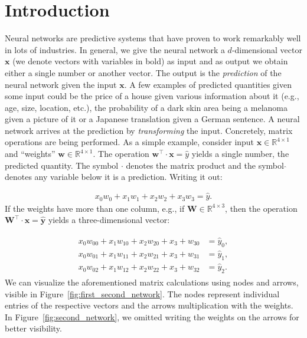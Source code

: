 \section{Introduction}
Neural networks are predictive systems that have proven to work remarkably well in lots of industries. In general, we give the neural network a $d$-dimensional vector $\bm{x}$ (we denote vectors with variables in bold) as input and as output we obtain either a single number or another vector. The output is the \textit{prediction} of the neural network given the input $\bm{x}$. A few examples of predicted quantities given some input could be the price of a house given various information about it (e.g., age, size, location, etc.), the probability of a dark skin area being a melanoma given a picture of it or a Japanese translation given a German sentence. A neural network arrives at the prediction by \textit{transforming} the input. Concretely, matrix operations are being performed. As a simple example, consider input $\bm{x} \in \mathds{R}^{4 \times 1}$ and \enquote{weights} $\bm{w} \in \mathds{R}^{4 \times 1}$. The operation $\bm{w}^\top \cdot \bm{x} = \hat{y}$ yields a single number, the predicted quantity. The symbol $\cdot$ denotes the matrix product and the symbol $\hat{}$ denotes any variable below it is a prediction. Writing it out:

\begin{align} \label{eq:first_network}
    x_0 w_0 + x_1 w_1 + x_2 w_2 + x_3 w _3 = \hat{y}.
\end{align} If the weights have more than one column, e.g., if $\bm{W} \in \mathds{R}^{4 \times 3}$, then the operation $\bm{W}^\top \cdot \bm{x} = \hat{\bm{y}}$ yields a three-dimensional vector:

\begin{align} \label{eq:second_network}
    \begin{split}
        x_0 w_{00} + x_1 w_{10} + x_2 w_{20} + x_3 + w_{30} & = \hat{y}_0, \\
        x_0 w_{01} + x_1 w_{11} + x_2 w_{21} + x_3 + w_{31} & = \hat{y}_1, \\
        x_0 w_{02} + x_1 w_{12} + x_2 w_{22} + x_3 + w_{32} & = \hat{y}_2.
    \end{split}
\end{align}We can visualize the aforementioned matrix calculations using nodes and arrows, visible in Figure~\ref{fig:first_second_network}. The nodes represent individual entries of the respective vectors and the arrows multiplication with the weights. In Figure~\ref{fig:second_network}, we omitted writing the weights on the arrows for better visibility.


